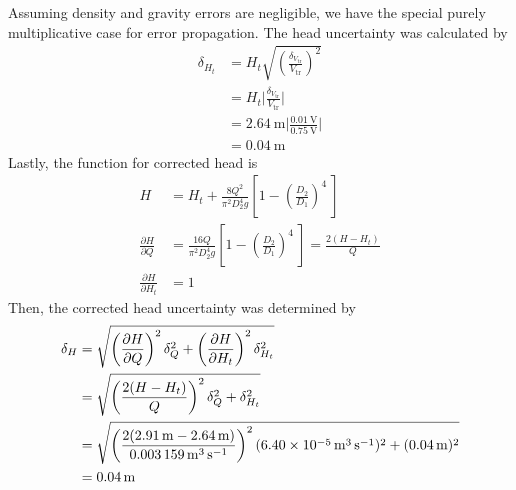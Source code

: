 Assuming density and gravity errors are negligible, we have the special purely multiplicative case for error propagation. The head uncertainty was calculated by
\begin{align*}
    \delta_{H_t} &= H_t \sqrt{\left(\frac{\delta_{V_{\text{tr}}}}{V_{\text{tr}}}\right)^2} \\
    &= H_t \bigg|\frac{\delta_{V_{\text{tr}}}}{V_{\text{tr}}}\bigg| \\
    &= \qty{2.64}{\meter} \bigg|\frac{\qty{0.01}{\volt}}{\qty{0.75}{\volt}}\bigg| \\
    &= \qty{0.04}{\meter}
\end{align*}
Lastly, the function for corrected head is
\begin{align*}
    H &= H_t + \frac{8Q^2}{\pi^2 D_2^4 g} \left[1 - \left(\frac{D_2}{D_1}\right)^4\ \right] \\
    \frac{\partial H}{\partial Q} &= \frac{16Q}{\pi^2 D_2^4 g}\left[1 - \left(\frac{D_2}{D_1}\right)^4\ \right] = \frac{2(H - H_t)}{Q} \\
    \frac{\partial H}{\partial H_t} &= 1 
\end{align*}
Then, the corrected head uncertainty was determined by
\begin{align*}
    \delta_{H} &= \sqrt{\left(\frac{\partial H}{\partial Q}\right)^2 \delta_Q^2 + \left(\frac{\partial H}{\partial H_t}\right)^2 \delta_{H_t}^2} \\
    &= \sqrt{\left(\frac{2(H - H_t)}{Q}\right)^2 \delta_Q^2 + \delta_{H_t}^2} \\
    &= \sqrt{\left(\frac{2(\qty{2.91}{\meter} - \qty{2.64}{\meter})}{\qty{0.003159}{\meter\cubed\per\second}}\right)^2 (\qty{6.40E-05}{\meter\cubed\per\second})^2 + (\qty{0.04}{\meter})^2} \\
    &= \qty{0.04}{\meter}
\end{align*}

